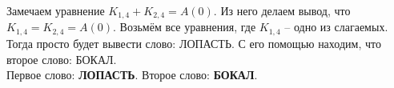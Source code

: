 \documentclass[12pt, a4paper] {ncc}
\begin{document}
	Замечаем уравнение $K_{1,4} + K_{2,4} = A (0)$. Из него делаем вывод, что $K_{1,4} = K_{2,4} = A (0)$.
	Возьмём все уравнения, где $K_{1,4}$ -- одно из слагаемых. Тогда просто будет вывести слово: ЛОПАСТЬ.
    С его помощью находим, что второе слово: БОКАЛ.  \\

	Первое слово: \textbf{ЛОПАСТЬ}.
	Второе слово: \textbf{БОКАЛ}.
\end{document}
